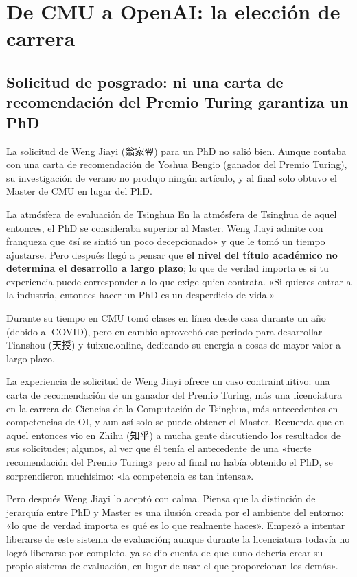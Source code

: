 \section{De CMU a OpenAI: la elección de carrera}

\subsection{Solicitud de posgrado: ni una carta de recomendación del Premio Turing garantiza un PhD}

La solicitud de Weng Jiayi (翁家翌) para un PhD no salió bien. Aunque contaba con una carta de recomendación de Yoshua Bengio (ganador del Premio Turing), su investigación de verano no produjo ningún artículo, y al final solo obtuvo el Master de CMU en lugar del PhD.

\begin{knowledgebox}{La atmósfera de evaluación de Tsinghua}
En la atmósfera de Tsinghua de aquel entonces, el PhD se consideraba superior al Master. Weng Jiayi admite con franqueza que «sí se sintió un poco decepcionado» y que le tomó un tiempo ajustarse. Pero después llegó a pensar que \textbf{el nivel del título académico no determina el desarrollo a largo plazo}; lo que de verdad importa es si tu experiencia puede corresponder a lo que exige quien contrata. «Si quieres entrar a la industria, entonces hacer un PhD es un desperdicio de vida.»
\end{knowledgebox}

Durante su tiempo en CMU tomó clases en línea desde casa durante un año (debido al COVID), pero en cambio aprovechó ese periodo para desarrollar Tianshou (天授) y tuixue.online, dedicando su energía a cosas de mayor valor a largo plazo.

La experiencia de solicitud de Weng Jiayi ofrece un caso contraintuitivo: una carta de recomendación de un ganador del Premio Turing, más una licenciatura en la carrera de Ciencias de la Computación de Tsinghua, más antecedentes en competencias de OI, y aun así solo se puede obtener el Master. Recuerda que en aquel entonces vio en Zhihu (知乎) a mucha gente discutiendo los resultados de sus solicitudes; algunos, al ver que él tenía el antecedente de una «fuerte recomendación del Premio Turing» pero al final no había obtenido el PhD, se sorprendieron muchísimo: «la competencia es tan intensa».

Pero después Weng Jiayi lo aceptó con calma. Piensa que la distinción de jerarquía entre PhD y Master es una ilusión creada por el ambiente del entorno: «lo que de verdad importa es qué es lo que realmente haces». Empezó a intentar liberarse de este sistema de evaluación; aunque durante la licenciatura todavía no logró liberarse por completo, ya se dio cuenta de que «uno debería crear su propio sistema de evaluación, en lugar de usar el que proporcionan los demás».

